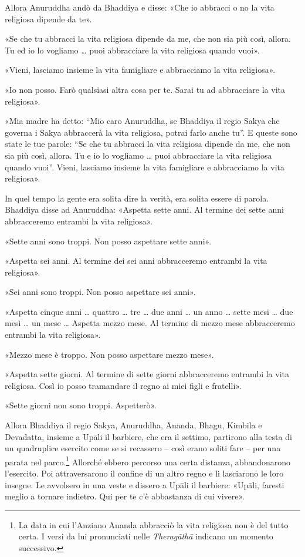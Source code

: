 Allora Anuruddha andò da Bhaddiya e disse: «Che io abbracci o no la vita
religiosa dipende da te».


«Se che tu abbracci la vita religiosa dipende da me, che non sia più
così, allora. Tu ed io lo vogliamo … puoi abbracciare la vita
religiosa quando vuoi».


«Vieni, lasciamo insieme la vita famigliare e abbracciamo la vita
religiosa».


«Io non posso. Farò qualsiasi altra cosa per te. Sarai tu ad abbracciare
la vita religiosa».


«Mia madre ha detto: “Mio caro Anuruddha, se Bhaddiya il regio Sakya che
governa i Sakya abbraccerà la vita religiosa, potrai farlo anche tu”. E
queste sono state le tue parole: “Se che tu abbracci la vita religiosa
dipende da me, che non sia più così, allora. Tu e io lo vogliamo …
puoi abbracciare la vita religiosa quando vuoi”. Vieni, lasciamo insieme
la vita famigliare e abbracciamo la vita religiosa».


In quel tempo la gente era solita dire la verità, era solita essere di
parola. Bhaddiya disse ad Anuruddha: «Aspetta sette anni. Al termine dei
sette anni abbracceremo entrambi la vita religiosa».


«Sette anni sono troppi. Non posso aspettare sette anni».


«Aspetta sei anni. Al termine dei sei anni abbracceremo entrambi la vita
religiosa».


«Sei anni sono troppi. Non posso aspettare sei anni».


«Aspetta cinque anni … quattro … tre … due anni … un anno …
sette mesi … due mesi … un mese … Aspetta mezzo mese. Al termine
di mezzo mese abbracceremo entrambi la vita religiosa».


«Mezzo mese è troppo. Non posso aspettare mezzo mese».


«Aspetta sette giorni. Al termine di sette giorni abbracceremo entrambi
la vita religiosa. Così io posso tramandare il regno ai miei figli e
fratelli».


«Sette giorni non sono troppi. Aspetterò».


Allora Bhaddiya il regio Sakya, Anuruddha, Ānanda, Bhagu, Kimbila e
Devadatta, insieme a Upāli il barbiere, che era il settimo, partirono
alla testa di un quadruplice esercito come se si recassero – così erano
soliti fare – per una parata nel parco.\footnote{La data in cui l’Anziano Ānanda abbracciò la vita religiosa non è del tutto certa. I versi da lui pronunciati nelle \emph{Theragāthā} indicano un momento successivo.} Allorché ebbero
percorso una certa distanza, abbandonarono l’esercito. Poi
attraversarono il confine di un altro regno e lì lasciarono le loro
insegne. Le avvolsero in una veste e dissero a Upāli il barbiere:
«Upāli, faresti meglio a tornare indietro. Qui per te c’è abbastanza di
cui vivere».


